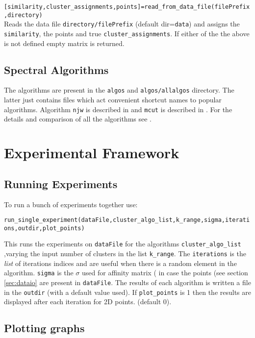 \documentclass[10pt]{article}
\begin{document}
\texttt{[similarity,cluster\_assignments,points]=read\_from\_data\_file(filePrefix,directory)}
\\
Reads the data file \texttt{directory/filePrefix} (default
dir=\texttt{data}) and assigns the \texttt{similarity}, the points and true
\texttt{cluster\_assignments}. If either of the the above is not defined empty
matrix is returned.




\subsection{Spectral Algorithms}
\label{sec:algos}


The algorithms are present in the \texttt{algos} and
\texttt{algos/allalgos} directory. The latter just contains files which
act convenient shortcut names to popular algorithms. Algorithm
\texttt{njw} is described in \cite{NgJW01} and \texttt{mcut} is
described in \cite{MeilaS00}. For the details and comparison of all the
algorithms see \cite{VM03}. 


\section{Experimental Framework}
\subsection{Running Experiments}
\label{sec:exp}

To run a bunch of experiments together use: 

\texttt{run\_single\_experiment(dataFile,cluster\_algo\_list,k\_range,sigma,iterations,outdir,plot\_points)}

This runs the experiments on \texttt{dataFile} for the algorithms
\texttt{cluster\_algo\_list} ,varying the input number of clusters in
the list \texttt{k\_range}. The \texttt{iterations} is the \emph{list}
of iterations indices and are useful when there is a random element in
the algorithm. \texttt{sigma} is the $\sigma$ used for affinity matrix (\cite{NgJW01}
in case the points (see section \ref{sec:dataio} are present in
\texttt{dataFile}. The results of each algorithm is written a file in
the \texttt{outdir} (with a default value used). If
\texttt{plot\_points} is 1 then the results are displayed after each
iteration for 2D points. (default 0). 


\subsection{Plotting graphs}
\label{sec:plot}
\end{document}
